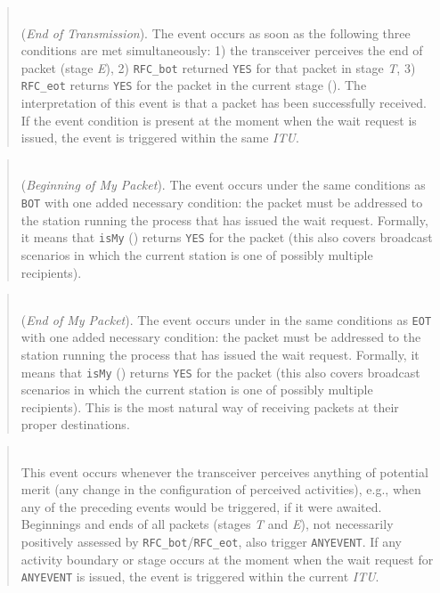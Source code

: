 \begin{quote}
\noindent{}\\ \hspace{0in}
({\em End of Transmission\/}).
The event occurs as soon as the following three conditions are met
simultaneously: 1) the transceiver perceives the end of packet
(stage {\em E\/}), 2) {\tt RFC\_bot} returned {\tt YES} for that packet
in stage {\em T}, 3)
{\tt RFC\_eot} returns {\tt YES} for the packet in the
current stage ().
The interpretation of this event is that a packet has been successfully
received.
If the event condition is present at the moment when the wait request is
issued, the event is triggered within the same {\em ITU}.
\end{quote}

\begin{quote}
\noindent{}\\ \hspace{0in}
({\em Beginning of My Packet\/}).
The event occurs under the same conditions as {\tt BOT} with one added necessary
condition: the packet must be addressed to the station running the process
that has issued the wait request.
Formally, it means that {\tt isMy} () returns {\tt YES}
for the packet (this also covers broadcast scenarios in which the current
station is one of possibly multiple recipients).
\end{quote}

\begin{quote}
\noindent{}\\ \hspace{0in}
({\em End of My Packet\/}).
The event occurs under
in the same conditions as {\tt EOT} with one added necessary
condition: the packet must be addressed to the station running the process
that has issued the wait request.
Formally, it means that {\tt isMy} () returns {\tt YES}
for the packet (this also covers broadcast scenarios in which the current
station is one of possibly multiple recipients).
This is the most natural way of receiving packets at their proper
destinations.
\end{quote}

\begin{quote}
\noindent{}\\ \hspace{0in}
This event occurs whenever the transceiver perceives anything of
potential merit (any change in the configuration of perceived activities),
e.g., when any of the preceding events would be triggered,
if it were awaited.
Beginnings and ends of all packets (stages {\em T\/} and {\em E\/}),
not necessarily
positively assessed by {\tt RFC\_bot}/{\tt RFC\_eot}, also
trigger {\tt ANYEVENT}.
If any activity boundary or stage occurs at the moment when the wait request
for {\tt ANYEVENT} is issued,
the event is triggered within the current {\em ITU}.
\end{quote}

